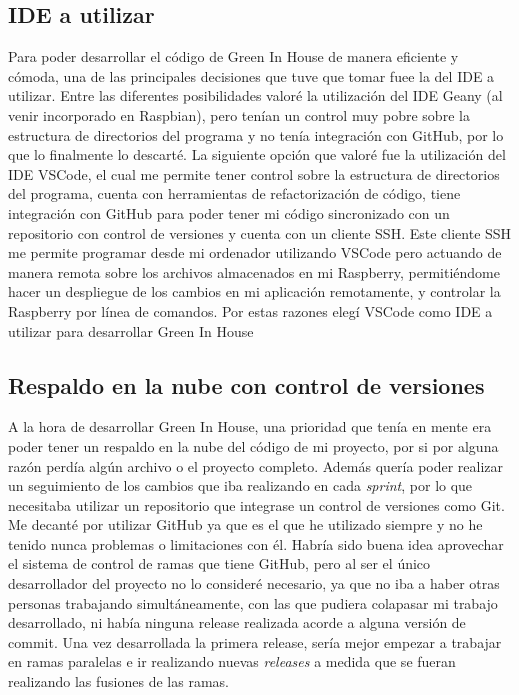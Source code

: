     \subsection{IDE a utilizar}
    Para poder desarrollar el código de Green In House de manera eficiente y cómoda, una de las principales decisiones que tuve que tomar fuee la del IDE a utilizar. Entre las diferentes posibilidades valoré la utilización del IDE Geany (al venir incorporado en Raspbian), pero tenían un control muy pobre sobre la estructura de directorios del programa y no tenía integración con GitHub, por lo que lo finalmente lo descarté. La siguiente opción que valoré fue la utilización del IDE VSCode, el cual me permite tener control sobre la estructura de directorios del programa, cuenta con herramientas de refactorización de código, tiene integración con GitHub para poder tener mi código sincronizado con un repositorio con control de versiones y cuenta con un cliente SSH. Este cliente SSH me permite programar desde mi ordenador utilizando VSCode pero actuando de manera remota sobre los archivos almacenados en mi Raspberry, permitiéndome hacer un despliegue de los cambios en mi aplicación remotamente, y controlar la Raspberry por línea de comandos. Por estas razones elegí VSCode como IDE a utilizar para desarrollar Green In House

    \subsection{Respaldo en la nube con control de versiones}
    A la hora de desarrollar Green In House, una prioridad que tenía en mente era poder tener un respaldo en la nube del código de mi proyecto, por si por alguna razón perdía algún archivo o el proyecto completo. 
    Además quería poder realizar un seguimiento de los cambios que iba realizando en cada \textit{sprint}, por lo que necesitaba utilizar un repositorio que integrase un control de versiones como Git. Me decanté por utilizar GitHub ya que es el que he utilizado siempre y no he tenido nunca problemas o limitaciones con él. Habría sido buena idea aprovechar el sistema de control de ramas que tiene GitHub, pero al ser el único desarrollador del proyecto no lo consideré necesario, ya que no iba a haber otras personas trabajando simultáneamente, con las que pudiera colapasar mi trabajo desarrollado, ni había ninguna release realizada acorde a alguna versión de commit. Una vez desarrollada la primera release, sería mejor empezar a trabajar en ramas paralelas e ir realizando nuevas \textit{releases} a medida que se fueran realizando las fusiones de las ramas.

